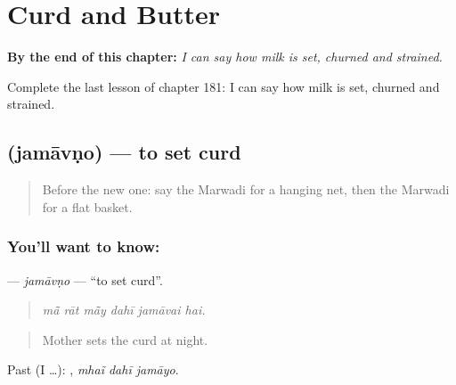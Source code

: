 
\chapter{Curd and Butter}
\label{ch:mw-curd-and-butter}

\begin{chapteropening}
\textbf{By the end of this chapter:} \emph{I can say how milk is set, churned and strained.}

Complete the last lesson of chapter 181: I can say how milk is set, churned and strained.
\end{chapteropening}

\section[\texorpdfstring{\mw{जमावणो} (jamāvṇo)}{जमावणो (jamāvṇo)}]{ (jamāvṇo) — to set curd}

\label{lesson:MW-C181-jamavno}



\begin{quote}
Before the new one: say the Marwadi for a hanging net, then the Marwadi for a flat basket.
\end{quote}

\subsection*{You'll want to know: }
\textbf{} — \emph{jamāvṇo} — \textquotedblleft{}to set curd\textquotedblright{}.

\begin{quote}
     
\end{quote}

\begin{quote}
\emph{mā̃ rāt mā̃y dahī jamāvai hai.}
\end{quote}

\begin{quote}
Mother sets the curd at night.
\end{quote}

Past (I …):   , \emph{mhaĩ dahī jamāyo}.

